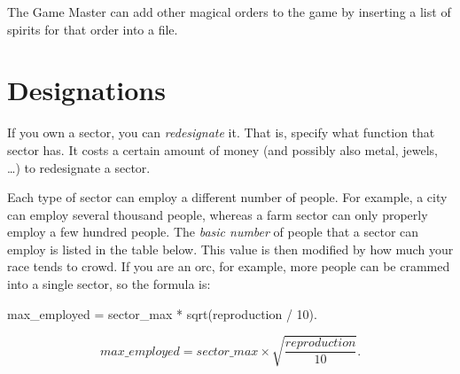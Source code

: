 The Game Master can add other magical orders to the game by inserting
a list of spirits for that order into a file.

\section{Designations}
If you own a sector, you can \emph{redesignate} it.  That is, specify
what function that sector has.  It costs a certain amount of money
(and possibly also metal, jewels, \dots{}) to redesignate a sector.

Each type of sector can employ a different number of people.  For
example, a city can employ several thousand people, whereas a farm
sector can only properly employ a few hundred people.  The \emph{basic
number} of people that a sector can employ is listed in the table
below.  This value is then modified by how much your race tends to
crowd.  If you are an orc, for example, more people can be crammed
into a single sector, so the formula is:
\begin{ifinfo}
	max_employed = sector_max * sqrt(reproduction / 10).
\end{ifinfo}
\begin{tex}
\[ max\_employed = sector\_max \times \sqrt{\frac{reproduction}{10}}. \]
\end{tex}

